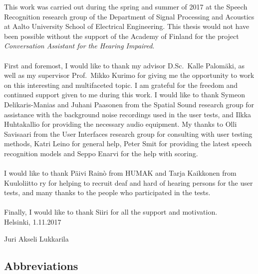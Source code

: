 \documentclass[english, 12pt, a4paper, pdftex, elec, utf8]{aaltothesis}
\begin{document}
This work was carried out during the spring and summer of 2017 at the Speech Recognition research group of the Department of Signal Processing and Acoustics at Aalto University School of Electrical Engineering. This thesis would not have been possible without the support of the Academy of Finland for the project \textit{Conversation Assistant for the Hearing Impaired}. \\\\
First and foremost, I would like to thank my advisor D.Sc.\ Kalle Palomäki, as well as my supervisor Prof.\ Mikko Kurimo for giving me the opportunity to work on this interesting and multifaceted topic. I am grateful for the freedom and continued support given to me during this work. I would like to thank Symeon Delikaris-Manias and Juhani Paasonen from the Spatial Sound research group for assistance with the background noise recordings used in the user tests, and Ilkka Huhtakallio for providing the necessary audio equipment. My thanks to Olli Savisaari from the User Interfaces research group for consulting with user testing methods, Katri Leino for general help, Peter Smit for providing the latest speech recognition models and Seppo Enarvi for the help with scoring. \\\\
I would like to thank Päivi Rainò from HUMAK and Tarja Kaikkonen from Kuuloliitto ry for helping to recruit deaf and hard of hearing persons for the user tests, and many thanks to the people who participated in the tests. \\\\
Finally, I would like to thank Siiri for all the support and motivation. \\

\vspace{1cm}
\noindent Helsinki, 1.11.2017

\vspace{5mm}
\noindent Juri Akseli Lukkarila

\newpage

\thesistableofcontents


\subsection*{Abbreviations}
\end{document}
